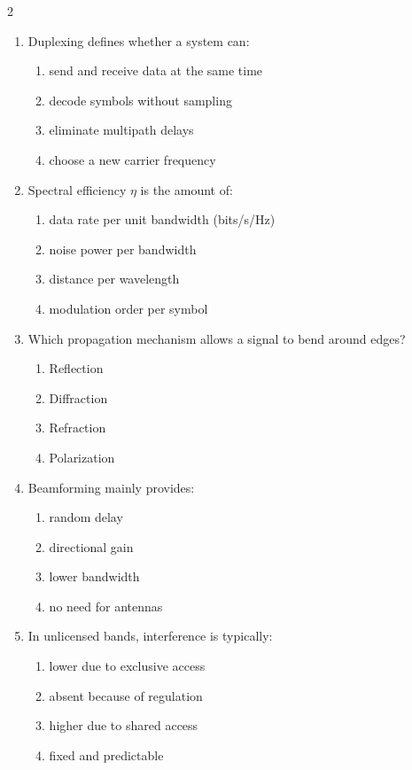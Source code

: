 \begin{multicols}{2}
\begin{enumerate}[leftmargin=*, itemsep=0.4em]
\item Duplexing defines whether a system can:
\begin{enumerate}[label=\alph*)]
\item send and receive data at the same time
\item decode symbols without sampling
\item eliminate multipath delays
\item choose a new carrier frequency
\end{enumerate}

\item Spectral efficiency $\eta$ is the amount of:
\begin{enumerate}[label=\alph*)]
\item data rate per unit bandwidth (bits/s/Hz)
\item noise power per bandwidth
\item distance per wavelength
\item modulation order per symbol
\end{enumerate}

\item Which propagation mechanism allows a signal to bend around edges?
\begin{enumerate}[label=\alph*)]
\item Reflection
\item Diffraction
\item Refraction
\item Polarization
\end{enumerate}

\item Beamforming mainly provides:
\begin{enumerate}[label=\alph*)]
\item random delay
\item directional gain
\item lower bandwidth
\item no need for antennas
\end{enumerate}

\item In unlicensed bands, interference is typically:
\begin{enumerate}[label=\alph*)]
\item lower due to exclusive access
\item absent because of regulation
\item higher due to shared access
\item fixed and predictable
\end{enumerate}


\end{enumerate}
\end{multicols}
